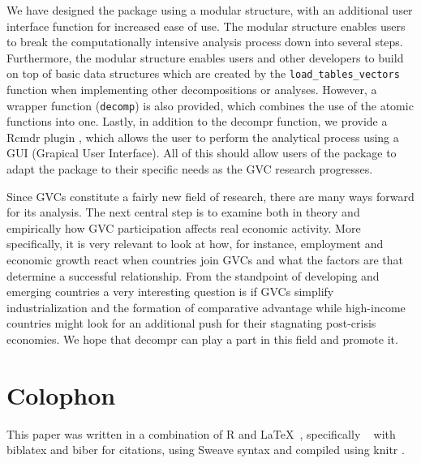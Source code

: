 \documentclass[a4paper]{article}\usepackage[]{graphicx}\usepackage[]{color}
\begin{document}
We have designed the package using a modular structure, with an additional user interface function for increased ease of use.
The modular structure enables users to break the computationally intensive analysis process down into several steps.
Furthermore, the modular structure enables users and other developers to build on top of basic data structures which are created by the \verb!load_tables_vectors! function when implementing other decompositions or analyses.
However, a wrapper function (\verb!decomp!) is also provided, which combines the use of the atomic functions into one.
Lastly, in addition to the decompr function, we provide a Rcmdr plugin \parencite{fox2005getting, fox2007extending}, which allows the user to perform the analytical process using a GUI (Grapical User Interface).
All of this should allow users of the package to adapt the package to their specific needs as the GVC research progresses.

Since GVCs constitute a fairly new field of research, there are many ways forward for its analysis. 
The next central step is to examine both in theory and empirically how GVC participation affects real economic activity. 
More specifically, it is very relevant to look at how, for instance, 
employment and economic growth react when countries join GVCs and what the factors are that determine a successful relationship. 
From the standpoint of developing and emerging countries a very interesting question is if GVCs simplify industrialization 
and the formation of comparative advantage 
while high-income countries might look for an additional push for their stagnating post-crisis economies. 
We hope that decompr can play a part in this field and promote it.

\nocite{wickham2014advanced}
\nocite{fox2012rcmdrplugin}


\section*{Colophon}
This paper was written in a combination of R \parencite{core2014r} and \LaTeX ~\parencite{lamport1986document}, specifically \LuaTeX ~\parencite{hagen2005luatex} with biblatex and biber \parencite{lehman2006biblatex} for citations, using Sweave syntax \parencite{leisch2003sweave} and compiled using knitr \parencite{yihui2013knitr}. 

\newpage


\printbibliography
\end{document}
